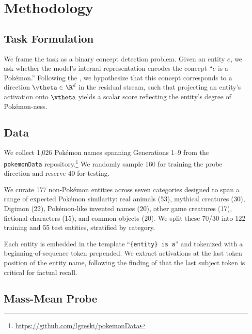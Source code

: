 \section{Methodology}
\label{sec:method}

\subsection{Task Formulation}
\label{sec:task}

We frame the task as a binary concept detection problem. Given an entity $e$, we ask whether the model's internal representation encodes the concept ``$e$ is a Pok\'{e}mon.'' Following the \lrh, we hypothesize that this concept corresponds to a direction $\vtheta \in \R^d$ in the residual stream, such that projecting an entity's activation onto $\vtheta$ yields a scalar score reflecting the entity's degree of Pok\'{e}mon-ness.

\subsection{Data}
\label{sec:data}

We collect 1,026 Pok\'{e}mon names spanning Generations 1--9 from the \texttt{pokemonData} repository.\footnote{\url{https://github.com/lgreski/pokemonData}} We randomly sample 160 for training the probe direction and reserve 40 for testing.

We curate 177 non-Pok\'{e}mon entities across seven categories designed to span a range of expected Pok\'{e}mon similarity: real animals (53), mythical creatures (30), Digimon (22), Pok\'{e}mon-like invented names (20), other game creatures (17), fictional characters (15), and common objects (20). We split these 70/30 into 122 training and 55 test entities, stratified by category.

Each entity is embedded in the template ``\texttt{\{entity\} is a}'' and tokenized with a beginning-of-sequence token prepended. We extract activations at the last token position of the entity name, following the finding of \citet{meng2022locating} that the last subject token is critical for factual recall.

\subsection{Mass-Mean Probe}
\label{sec:probe}

